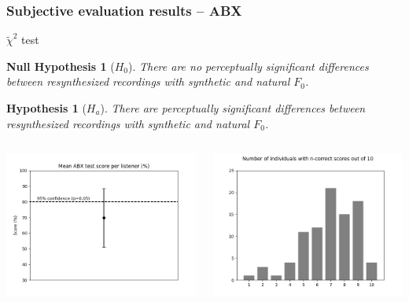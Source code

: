 \documentclass[a4paper,9pt]{beamer}
\theoremstyle{mytheoremstyle}
\newtheorem*{unnumberedhypothesis}{Hypothesis}
\newtheorem*{unnumberednullhypothesis}{Null Hypothesis}
\begin{document}
\begin{frame}
\frametitle{Subjective evaluation results -- ABX}
\begin{exampleblock}{$\tilde{\chi}^2$ test}
\begin{unnumberednullhypothesis}[$H_0$]
	There are no perceptually significant differences between resynthesized recordings with synthetic and natural $F_0$.
\end{unnumberednullhypothesis}
\begin{unnumberedhypothesis}[$H_a$]
	There are perceptually significant differences between resynthesized recordings with synthetic and natural $F_0$.
\end{unnumberedhypothesis}
\end{exampleblock}
\begin{columns}
\begin{center}
  \includegraphics[width=\textwidth]{res/ABX_individual}
\end{center}
\begin{center}
  \includegraphics[width=\textwidth]{res/ABX_histogram}
\end{center}
\end{columns}
\end{frame}
\end{document}
